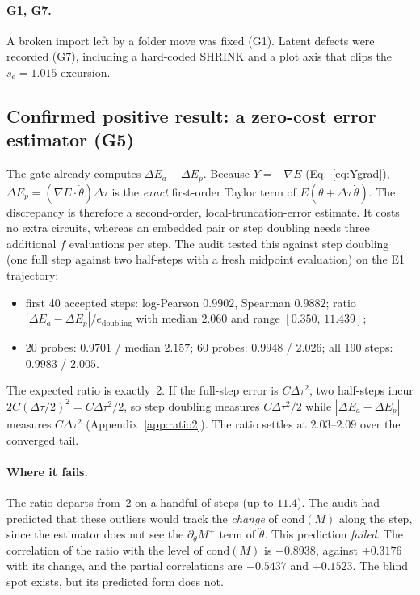 \documentclass[aps,pra,reprint,superscriptaddress,nofootinbib]{revtex4-2}
\newcommand{\dt}{\Delta\tau}
\newcommand{\thetadot}{\dot\theta}
\newcommand{\cond}{\mathrm{cond}}
\begin{document}
\paragraph*{G1, G7.} A broken import left by a folder move was fixed (G1). Latent defects were
recorded (G7), including a hard-coded SHRINK and a plot axis that clips the $s_e=1.015$
excursion.

\subsection{Confirmed positive result: a zero-cost error estimator (G5)}
\label{sec:g5}

The gate already computes $\Delta E_a-\Delta E_p$. Because $Y=-\nabla E$
(Eq.~\eqref{eq:Ygrad}), $\Delta E_p=(\nabla E\cdot\thetadot)\dt$ is the \emph{exact}
first-order Taylor term of $E(\theta+\dt\,\thetadot)$. The discrepancy is therefore a
second-order, local-truncation-error estimate. It costs no extra circuits, whereas an embedded
pair or step doubling needs three additional $f$ evaluations per step. The audit tested this
against step doubling (one full step against two half-steps with a fresh midpoint evaluation)
on the E1 trajectory:
\begin{itemize}
\setlength\itemsep{0pt}
\item first 40 accepted steps: log-Pearson $0.9902$, Spearman $0.9882$; ratio
  $|\Delta E_a-\Delta E_p|/e_{\mathrm{doubling}}$ with median $2.060$ and range
  $[0.350,\,11.439]$;
\item 20 probes: $0.9701$ / median $2.157$; 60 probes: $0.9948$ / $2.026$; all 190 steps:
  $0.9983$ / $2.005$.
\end{itemize}
The expected ratio is exactly~2. If the full-step error is $C\dt^2$, two half-steps incur
$2C(\dt/2)^2=C\dt^2/2$, so step doubling measures $C\dt^2/2$ while $|\Delta E_a-\Delta E_p|$
measures $C\dt^2$ (Appendix~\ref{app:ratio2}). The ratio settles at $2.03$--$2.09$ over the
converged tail.

\paragraph*{Where it fails.} The ratio departs from~2 on a handful of steps (up to $11.4$). The
audit had predicted that these outliers would track the \emph{change} of $\cond(M)$ along the
step, since the estimator does not see the $\partial_\theta M^{+}$ term of $\ddot\theta$. This
prediction \emph{failed}. The correlation of the ratio with the level of $\cond(M)$ is
$-0.8938$, against $+0.3176$ with its change, and the partial correlations are $-0.5437$ and
$+0.1523$. The blind spot exists, but its predicted form does not.
\end{document}
